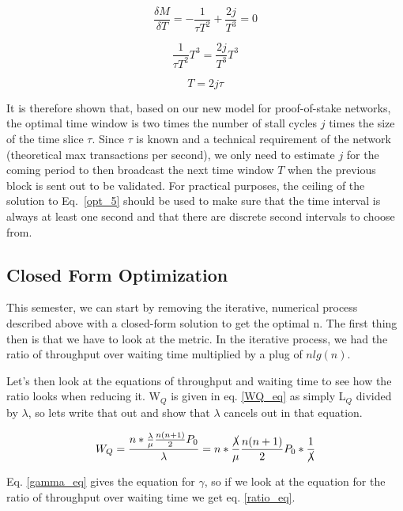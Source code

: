 \documentclass[conference]{IEEEtran}
\begin{document}
\begin{equation}
  \frac{\delta M}{\delta T} = -\frac{1}{\tau T^2}+\frac{2j}{T^3}=0\label{opt_3}
\end{equation}

\begin{equation}
  \frac{1}{\tau T^2}T^3=\frac{2j}{T^3}T^3\label{opt_4}
\end{equation}

\begin{equation}
  T=2j\tau \label{opt_5}
\end{equation}

It is therefore shown that, based on our new model for proof-of-stake networks, the optimal 
time window is two times the number of stall cycles $j$ times the size of the time slice $\tau$.
Since $\tau$ is known and a technical requirement of the network (theoretical max transactions
per second), we only need to estimate $j$ for the coming period to then broadcast the next time 
window $T$ when the previous block is sent out to be validated. For practical purposes, the 
ceiling of the solution to Eq.~\ref{opt_5} should be used to make sure that the time interval is always at least one
second and that there are discrete second intervals to choose from.

\iffalse
\subsection{Closed Form Optimization}\label{closed_opt}

This semester, we can start by removing the iterative, numerical process described above with 
a closed-form solution to get the optimal n. The first thing then is that we have to look at the metric.
In the iterative process, we had the ratio of throughput over waiting time multiplied by a plug of $n lg(n)$. 

Let's then look at the equations of throughput and waiting time to see how the ratio looks when reducing it. 
W$_Q$ is given in eq. \ref{WQ_eq} as simply L$_Q$ divided by $\lambda$, so lets write that out and 
show that $\lambda$ cancels out in that equation.

\begin{equation}
W_Q=\frac{n\ast\frac{\lambda}{\mu}\frac{n(n+1)}{2}P_0}{\lambda}=n\ast\frac{\cancel{\lambda}}{\mu}\frac{n(n+1)}{2}P_0\ast\frac{1}{\cancel{\lambda}}\label{WQ_reduced}
\end{equation}

Eq. \ref{gamma_eq} gives the equation for $\gamma$, so if we look at the equation for the ratio of throughput over waiting time we get eq. \ref{ratio_eq}. 
\end{document}
